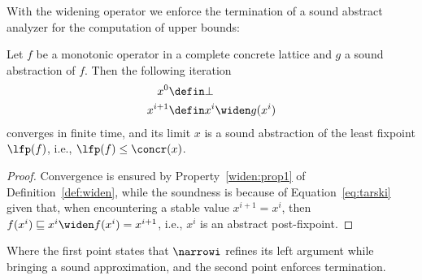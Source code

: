 With the widening operator we enforce the termination of a sound
abstract analyzer for the computation of upper bounds:

\begin{theorem}\label{th:convergence}
  Let \(f\) be a monotonic operator in a complete concrete lattice and
  \(g\) a sound abstraction of \(f\). Then the following iteration
  \begin{align*}
    x^0 & \defin \bot \\
    x^{i+1} & \defin x^i \widen g(x^i)
  \end{align*}
  converges in finite time, and its limit \(x\) is a sound abstraction
  of the least fixpoint \(\lfp(f)\), i.e., \(\lfp(f) \leq \concr(x)\).
\end{theorem}

\begin{proof}
  Convergence is ensured by Property~\ref{widen:prop1} of
  Definition~\ref{def:widen}, while the soundness is because of
  Equation~\eqref{eq:tarski} given that, when encountering a stable
  value \(x^{i+1} = x^i\), then
  \(f(x^i) \sqsubseteq x^i \widen f(x^i) = x^{i+1}\), i.e., \(x^i\) is
  an abstract post-fixpoint.
\end{proof}

Where the first point states that \(\narrowi\) refines its left
argument while bringing a sound approximation, and the second point
enforces termination.

